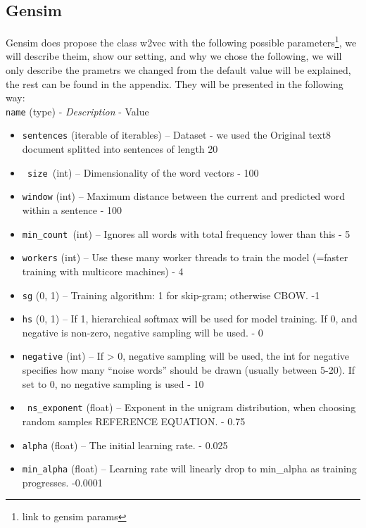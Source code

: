 \subsection{Gensim}
Gensim does propose the class w2vec with the following possible parameters\footnote{link to gensim params}, we will describe theim, show our setting, and why we chose the following, we will only describe the prametrs we changed from the default value will be explained, the rest can be found in the appendix. 
They will be presented in the following way: \\
\texttt{name} (type) - \textit{Description} - Value
\begin{itemize}

   \item \texttt{sentences} (iterable of iterables) – Dataset - we used the Original text8 document splitted into sentences of length 20
  \item \texttt{ size }(int) – Dimensionality of the word vectors - 100
\item    \texttt{window} (int) – Maximum distance between the current and predicted word within a sentence - 100
  \item  \texttt{min\_count }(int) – Ignores all words with total frequency lower than this - 5
 \item   \texttt{workers} (int) – Use these many worker threads to train the model (=faster training with multicore machines) - 4 
\item    \texttt{sg} ({0, 1}) – Training algorithm: 1 for skip-gram; otherwise CBOW. -1
  \item  \texttt{hs} ({0, 1}) – If 1, hierarchical softmax will be used for model training. If 0, and negative is non-zero, negative sampling will be used. - 0
  \item  \texttt{negative} (int) – If > 0, negative sampling will be used, the int for negative specifies how many “noise words” should be drawn (usually between 5-20). If set to 0, no negative sampling is used - 10 
\item   \texttt{ ns\_exponent} (float) – Exponent in the unigram distribution, when choosing random samples REFERENCE EQUATION. - 0.75
\item    \texttt{alpha} (float) – The initial learning rate. - 0.025
 \item   \texttt{min\_alpha} (float) – Learning rate will linearly drop to min\_alpha as training progresses. -0.0001


\end{itemize}
